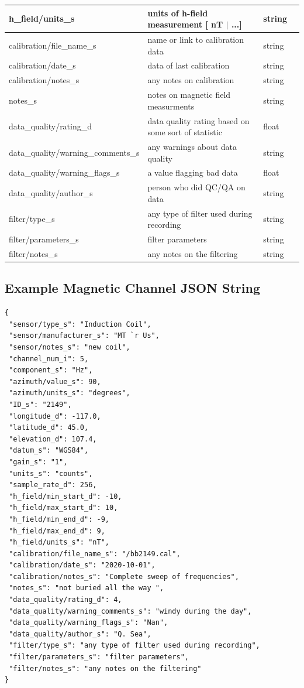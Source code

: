 \documentclass{article}
\begin{document}
\begin{table}[htb!]
\begin{tabular}{|l|p{3in}|l|l|}
		h\_field/units\_s & units of h-field measurement [ nT $|$ ...] & string &  \\ \hline
		calibration/file\_name\_s & name or link to calibration data & string &  \\ \hline
		calibration/date\_s & data of last calibration & string &  \\ \hline
		calibration/notes\_s & any notes on calibration & string &  \\ \hline
		notes\_s & notes on magnetic field measurments & string &  \\ \hline
		data\_quality/rating\_d & data quality rating based on some sort of statistic & float &  \\ \hline
		data\_quality/warning\_comments\_s & any warnings about data quality & string &  \\ \hline
		data\_quality/warning\_flags\_s & a value flagging bad data  & float &  \\ \hline
		data\_quality/author\_s & person who did QC/QA on data & string &  \\ \hline
		filter/type\_s & any type of filter used during recording & string &  \\ \hline
		filter/parameters\_s & filter parameters & string &  \\ \hline
		filter/notes\_s & any notes on the filtering & string &  \\ \hline
		\end{tabular}
	\label{tab:magnetic}
\end{table}

\newpage
\subsection{Example Magnetic Channel JSON String}

\begin{verbatim}
{
 "sensor/type_s": "Induction Coil",
 "sensor/manufacturer_s": "MT `r Us",
 "sensor/notes_s": "new coil",
 "channel_num_i": 5,
 "component_s": "Hz",
 "azimuth/value_s": 90,
 "azimuth/units_s": "degrees",
 "ID_s": "2149",
 "longitude_d": -117.0,
 "latitude_d": 45.0,
 "elevation_d": 107.4,
 "datum_s": "WGS84",
 "gain_s": "1",
 "units_s": "counts",
 "sample_rate_d": 256,
 "h_field/min_start_d": -10,
 "h_field/max_start_d": 10,
 "h_field/min_end_d": -9,
 "h_field/max_end_d": 9,
 "h_field/units_s": "nT",
 "calibration/file_name_s": "/bb2149.cal",
 "calibration/date_s": "2020-10-01",
 "calibration/notes_s": "Complete sweep of frequencies",
 "notes_s": "not buried all the way ",
 "data_quality/rating_d": 4,
 "data_quality/warning_comments_s": "windy during the day",
 "data_quality/warning_flags_s": "Nan",
 "data_quality/author_s": "Q. Sea",
 "filter/type_s": "any type of filter used during recording",
 "filter/parameters_s": "filter parameters",
 "filter/notes_s": "any notes on the filtering"
}
\end{verbatim}
\end{document}
